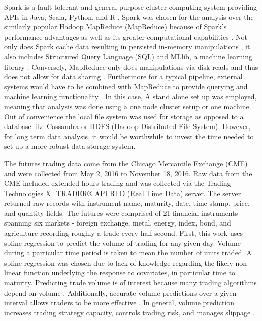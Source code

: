 \documentclass[12pt]{article}
\begin{document}
Spark is a fault-tolerant and general-purpose cluster computing system providing APIs in Java, Scala, Python, and R \cite{meng2016mllib}. Spark was chosen for the analysis over the similarly popular Hadoop MapReduce (MapReduce) because of Spark’s performance advantages as well as its greater computational capabilities \cite{zaharia2010spark}. Not only does Spark cache data resulting in persisted in-memory manipulations \cite{zaharia2012resilient}, it also includes Structured Query Language (SQL) and MLlib, a machine learning library \cite{meng2016mllib}. Conversely, MapReduce only does manipulations via disk reads and thus does not allow for data sharing \cite{zaharia2016apache}. Furthermore for a typical pipeline, external systems would have to be combined with MapReduce to provide querying and machine learning functionality \cite{zaharia2016apache}. In this case, 
A stand alone set up was employed, meaning that analysis was done using a one node cluster setup or one machine. Out of convenience the local file system was used for storage as opposed to a database like Cassandra or HDFS (Hadoop Distributed File System). However, for long term data analysis, it would be worthwhile to invest the time needed to set up a more robust data storage system. 

The futures trading data come from the Chicago Mercantile Exchange (CME) and were collected from May 2, 2016 to November 18, 2016. %
Raw data from the CME included extended hours trading and was collected via the Trading Technologies X\_TRADER® API RTD (Real Time Data) server. The server returned raw records with instrument name, maturity, date, time stamp, price, and quantity fields.
The futures were comprised of 21 financial instruments spanning six markets - foreign exchange, metal, energy, index, bond, and agriculture recording roughly a trade every half second. %
First, this work uses spline regression to predict the volume of trading for any given day. Volume during a particular time period is taken to mean the number of units traded. A spline regression was chosen due to lack of knowledge regarding the likely non-linear function underlying the response to covariates, in particular time to maturity. Predicting trade volume is of interest because many trading algorithms depend on volume \cite{satish2014predicting}.   Additionally, accurate volume predictions over a given interval allows traders to be more effective \cite{satish2014predicting}. In general, volume prediction increases trading strategy capacity, controls trading risk, and manages slippage \cite{satish2014predicting}.  
\end{document}
